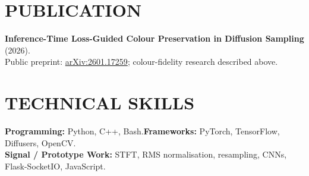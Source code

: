 \documentclass[10pt,a4paper]{article}
\begin{document}
\section{PUBLICATION}
\textbf{Inference-Time Loss-Guided Colour Preservation in Diffusion Sampling} (2026).\\
Public preprint: \href{https://arxiv.org/abs/2601.17259}{arXiv:2601.17259}; colour-fidelity research described above.
\section{TECHNICAL SKILLS}
\textbf{Programming:} Python, C++, Bash.\quad \textbf{Frameworks:} PyTorch, TensorFlow, Diffusers, OpenCV.\\\textbf{Signal / Prototype Work:} STFT, RMS normalisation, resampling, CNNs, Flask-SocketIO, JavaScript.
\end{document}
